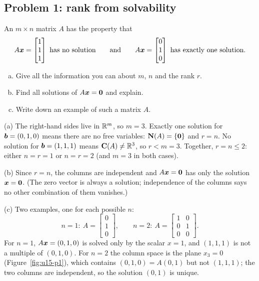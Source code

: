 \subsection{Problem 1: rank from solvability}

\begin{exercise}\label{ex:u15-p1}
An $m\times n$ matrix $A$ has the property that
\[
  A\vb{x}=\begin{bmatrix}1\\1\\1\end{bmatrix}\ \text{has no solution}
  \qquad\text{and}\qquad
  A\vb{x}=\begin{bmatrix}0\\1\\0\end{bmatrix}\ \text{has exactly one solution.}
\]
\begin{enumerate}[(a)]
  \item Give all the information you can about $m$, $n$ and the rank $r$.
  \item Find all solutions of $A\boldsymbol{x}=\boldsymbol{0}$ and explain.
  \item Write down an example of such a matrix $A$.
\end{enumerate}
\end{exercise}

\begin{solution}
(a) The right-hand sides live in $\mathbb{R}^m$, so $m=3$. Exactly one solution for
$\boldsymbol{b}=(0,1,0)$ means there are no free variables: $\mathbf{N}(A)=\{\boldsymbol{0}\}$ and $r=n$. No
solution for $\boldsymbol{b}=(1,1,1)$ means $\mathbf{C}(A)\neq\mathbb{R}^3$, so $r<m=3$. Together,
$r=n\le 2$: either $n=r=1$ or $n=r=2$ (and $m=3$ in both cases).

(b) Since $r=n$, the columns are independent and $A\boldsymbol{x}=\boldsymbol{0}$ has only the solution
$\boldsymbol{x}=\boldsymbol{0}$. (The zero vector is always a solution; independence of the columns says no
other combination of them vanishes.)

(c) Two examples, one for each possible $n$:
\[
  n=1:\ A=\begin{bmatrix}0\\1\\0\end{bmatrix},\qquad
  n=2:\ A=\begin{bmatrix}1&0\\0&1\\0&0\end{bmatrix}.
\]
For $n=1$, $A\boldsymbol{x}=(0,1,0)$ is solved only by the scalar $x=1$, and $(1,1,1)$ is not a
multiple of $(0,1,0)$. For $n=2$ the column space is the plane $x_3=0$
(Figure~\ref{fig:u15-p1}), which contains $(0,1,0)=A(0,1)$ but not $(1,1,1)$; the two
columns are independent, so the solution $(0,1)$ is unique.
\end{solution}

